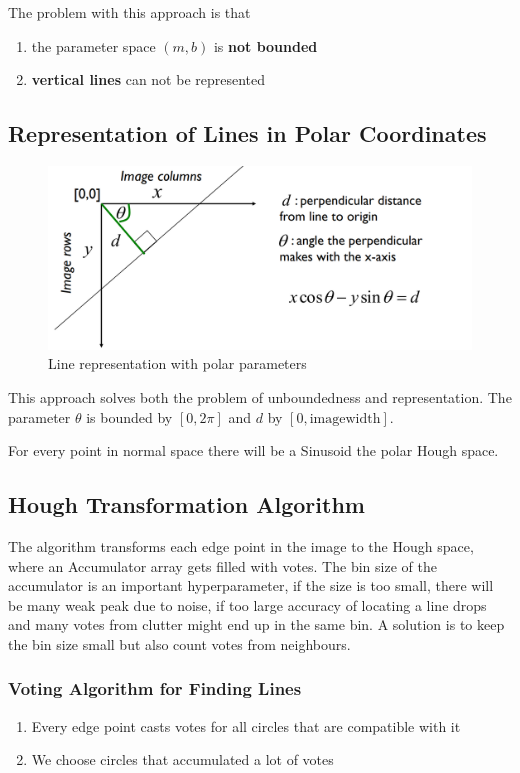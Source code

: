 \documentclass[11pt]{article}
\theoremstyle{definition}
\begin{document}
\noindent
The problem with this approach is that
\begin{enumerate}[label=\alph*.]
	\item the parameter space $(m,b)$ is \textbf{not bounded}
	\item \textbf{vertical lines} can not be represented
\end{enumerate}

\subsection{Representation of Lines in Polar Coordinates}

\begin{figure}[H]
	\centering
	\includegraphics[width=0.8\linewidth]{img/line_representation_polar}
	\caption{Line representation with polar parameters}
	\label{fig:linerepresentationpolar}
\end{figure}

This approach solves both the problem of unboundedness and representation. The parameter $\theta$ is bounded by $[0,2\pi]$ and $d$ by $[0,\text{imagewidth}]$.

For every point in normal space there will be a Sinusoid the polar Hough space.

\subsection{Hough Transformation Algorithm}
The algorithm transforms each edge point in the image to the Hough space, where an Accumulator array gets filled with votes. The bin size of the accumulator is an important hyperparameter, if the size is too small, there will be many weak peak due to noise, if too large accuracy of locating a line drops and many votes from clutter might end up in the same bin. A solution is to keep the bin size small but also count votes from neighbours.


\subsubsection{Voting Algorithm for Finding Lines}
\begin{enumerate}
	\item Every edge point casts votes for all circles that are compatible with it
	\item We choose circles that accumulated a lot of votes
\end{enumerate}
\end{document}

